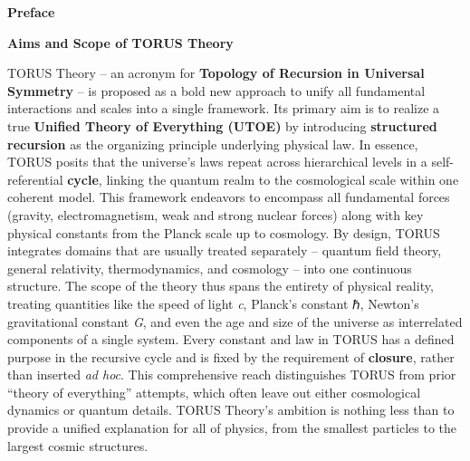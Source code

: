 \documentclass[]{article}
\date{}
\begin{document}
\textbf{Preface}

\textbf{Aims and Scope of TORUS Theory}

TORUS Theory -- an acronym for \textbf{Topology of Recursion in
Universal Symmetry} -- is proposed as a bold new approach to unify all
fundamental interactions and scales into a single framework. Its primary
aim is to realize a true \textbf{Unified Theory of Everything (UTOE)} by
introducing \textbf{structured recursion} as the organizing principle
underlying physical law. In essence, TORUS posits that the universe's
laws repeat across hierarchical levels in a self-referential
\textbf{cycle}, linking the quantum realm to the cosmological scale
within one coherent model. This framework endeavors to encompass all
fundamental forces (gravity, electromagnetism, weak and strong nuclear
forces) along with key physical constants from the Planck scale up to
cosmology. By design, TORUS integrates domains that are usually treated
separately -- quantum field theory, general relativity, thermodynamics,
and cosmology -- into one continuous structure. The scope of the theory
thus spans the entirety of physical reality, treating quantities like
the speed of light \emph{c}, Planck's constant ℏ, Newton's gravitational
constant \emph{G}, and even the age and size of the universe as
interrelated components of a single system. Every constant and law in
TORUS has a defined purpose in the recursive cycle and is fixed by the
requirement of \textbf{closure}, rather than inserted \emph{ad hoc}.
This comprehensive reach distinguishes TORUS from prior ``theory of
everything'' attempts, which often leave out either cosmological
dynamics or quantum details. TORUS Theory's ambition is nothing less
than to provide a unified explanation for all of physics, from the
smallest particles to the largest cosmic structures.
\end{document}
